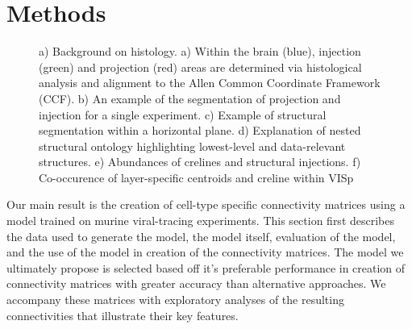 \section{Methods}

\begin{figure}[H]
    \newline
    \caption{a) Background on histology. a) Within the brain (blue), injection (green) and projection (red) areas are determined via histological analysis and alignment to the Allen Common Coordinate Framework (CCF). b) An example of the segmentation of projection and injection for a single experiment. \label{fig:1b} c) Example of structural segmentation within a horizontal plane. d) Explanation of nested structural ontology highlighting lowest-level and data-relevant structures. e) Abundances of crelines and structural injections. f) Co-occurence of layer-specific centroids and creline within VISp}
    \label{fig:data}
\end{figure}
\newpage


Our main result is the creation of cell-type specific connectivity matrices using a model trained on murine viral-tracing experiments.
This section first describes the data used to generate the model, the model itself, evaluation of the model, and the use of the model in creation of the connectivity matrices.
The model we ultimately propose is selected based off it's preferable performance in creation of connectivity matrices with greater accuracy than alternative approaches.
We accompany these matrices with exploratory analyses of the resulting connectivities that illustrate their key features. 

